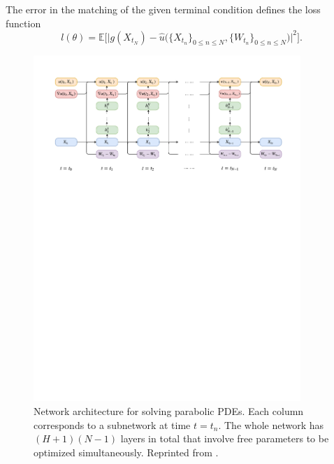 \documentclass[12pt]{article}
\theoremstyle{definition}
\newcommand{\E}{\mathbb{E}}
\begin{document}
The error in the {matching of the given terminal condition} defines the  loss function 
      \begin{equation}
        l(\theta) = 
        \E\Big[
          \big|g( X_{ t_N } ) - \hat{u}\big(\{ X_{ t_n } \}_{ 0 \leq n \leq N } , \{ W_{ t_n } \}_{ 0 \leq n \leq N }\big)\big|^2
        \Big].
      \end{equation}

%

\begin{figure}[H]
\centering
\includegraphics[width=0.9\textwidth]{./figs/nn_architecture_PDE.pdf}
\caption{Network architecture for solving parabolic PDEs. Each column corresponds to a subnetwork at time $t=t_n$. The whole network has $(H+1)(N-1)$ layers in total that involve free parameters to be optimized simultaneously. 
Reprinted from \cite{HanJentzenE2018}.}
\end{figure}
\end{document}
